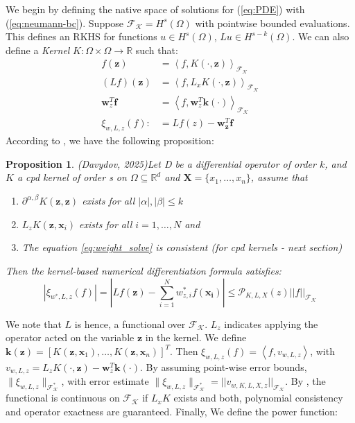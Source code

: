\documentclass[11pt]{article}
\newtheorem{proposition}{Proposition}
\begin{document}
We begin by defining the native space of solutions for (\ref{eq:PDE}) with (\ref{eq:neumann-bc}). Suppose $\mathcal{F_K} = H^{s}(\Omega)$ with pointwise bounded evaluations. This defines an RKHS for functions $u \in H^{s}(\Omega)$, $Lu \in H^{s-k}(\Omega)$. We can also define a \textit{Kernel} $K: \Omega \times \Omega \rightarrow \mathbb{R}$ such that:
\begin{align*}
	f(\bm{z}) &= \left\langle f, K(\cdot, \bm{z}) \right\rangle_{\mathcal{F_K}}\\
	(Lf)(\bm{z}) &= \left\langle f, L_x K(\cdot, \bm{z}) \right\rangle_{\mathcal{F_K}}\\
	\bm{w}^T_z \bm{f} &= \left\langle f, \bm{w}^T_z \bm{k(\cdot)} \right\rangle_{\mathcal{F_K}}\\
	\xi_{w,L,z}(f) :&= Lf(z) - \bm{w}^T_{\bm{z}} \bm{f}
\end{align*}
According to \cite{Davydov2025}, we have the following proposition:
\begin{proposition}
(Davydov, 2025)Let D be a differential operator of order $k$, and $K$ a cpd kernel of order s on $\Omega \subseteq \mathbb{R}^d$ and $\bm{X}=\{ x_1, \dots, x_n\}$, assume that
\begin{enumerate}
\item
$\partial^{\alpha,\beta}K(\bm{z},\bm{z})$ exists for all $|\alpha|, |\beta| \le k$
\item
$L_zK(\bm{z},\bm{x}_i)$ exists for all $i=1,\dots,N$ and
\item
The equation \ref{eq:weight_solve} is consistent (for cpd kernels - next section)
\end{enumerate}
Then the kernel-based numerical differentiation formula  satisfies:
\begin{equation}
\left| \xi_{w^*,L,z}(f) \right| = \left| Lf(\bm{z}) -\sum_{i=1}^N w_{z,i}^*f(\bm{x_i}) \right| \le \mathcal{P}_{K,L,X}(z) ||f||_\mathcal{F_K}
\end{equation}
\end{proposition}
\noindent We note that $L$ is hence, a functional over $\mathcal{F_K}$. $L_z$ indicates applying the operator acted on the variable $\bm{z}$ in the kernel. We define $\bm{k}(\bm{z}) = [K(\bm{z},\bm{x}_1), \hdots, K(\bm{z},\bm{x}_n)]^T$. Then $\xi_{w,L,z}(f) = \left \langle f, v_{w,L,z} \right \rangle$, with $v_{w,L,z} = L_z K(\cdot, \bm{z}) - \bm{w}^T_z \bm{k}(\cdot)$. By assuming point-wise error bounds, $\| \xi_{w,L,z} \|_\mathcal{F_K^*}$,  with error estimate $\| \xi_{w,L,z} \|_\mathcal{F_K^*} = ||v_{w,K,L,X,z}||_\mathcal{F_K}$. By \cite{Davydov2025}, the functional is continuous on $\mathcal{F_K}$ if $L_xK$ exists and both, polynomial consistency and operator exactness are guaranteed. Finally, We define the power function:
\end{document}
